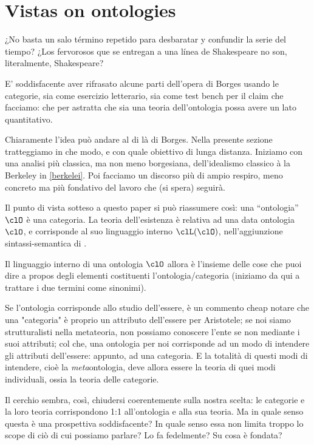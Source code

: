 \section{Vistas on ontologies}
\epigraph{¿No basta un salo término repetido para desbaratar y confundir la serie del tiempo? ¿Los fervorosos que se entregan a una línea de Shakespeare no son, literalmente, Shakespeare?}{\cite{confutacion}}
E' soddisfacente aver rifrasato alcune parti dell'opera di Borges usando le categorie, sia come esercizio letterario, sia come test bench per il claim che facciamo: che per astratta che sia una teoria dell'ontologia possa avere un lato quantitativo. 

Chiaramente l'idea può andare al di là di Borges. Nella presente sezione tratteggiamo in che modo, e con quale obiettivo di lunga distanza. Iniziamo con una analisi più classica, ma non meno borgesiana, dell'idealismo classico à la Berkeley in \autoref{berkelei}. Poi facciamo un discorso più di ampio respiro, meno concreto ma più fondativo del lavoro che (si spera) seguirà.

Il punto di vista sotteso a questo paper si può riassumere così: una ``ontologia'' $\clO$ è una categoria. La teoria dell'esistenza è relativa ad una data ontologia $\clO$, e corrisponde al suo linguaggio interno $\clL(\clO)$, nell'aggiunzione sintassi-semantica di \cite{}.

Il linguaggio interno di una ontologia $\clO$ allora è l'insieme delle cose che puoi dire a propos degli elementi costituenti l'ontologia/categoria (iniziamo da qui a trattare i due termini come sinonimi).

Se l'ontologia corrisponde allo studio dell'essere, è un commento cheap notare che una "categoria" è proprio un attributo dell'essere per Aristotele; se noi siamo strutturalisti nella metateoria, non possiamo conoscere l'ente se non mediante i suoi attributi; col che, una ontologia per noi corrisponde ad un modo di intendere gli attributi dell'essere: appunto, ad una categoria. E la totalità di questi modi di intendere, cioè la \emph{meta}ontologia, deve allora essere la teoria di quei modi individuali, ossia la teoria delle categorie.

Il cerchio sembra, così, chiudersi coerentemente sulla nostra scelta: le categorie e la loro teoria corrispondono 1:1 all'ontologia e alla sua teoria. Ma in quale senso questa è una prospettiva soddisfacente? In quale senso essa non limita troppo lo scope di ciò di cui possiamo parlare? Lo fa fedelmente? Su cosa è fondata?

